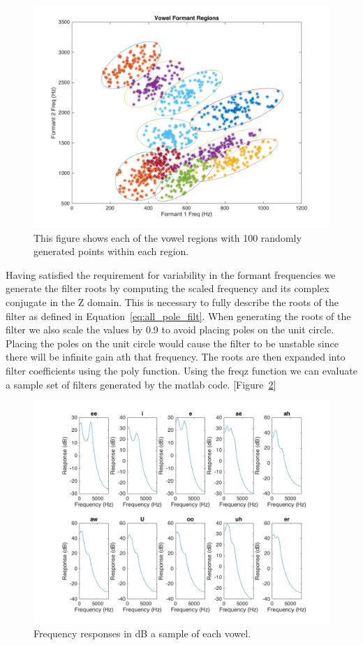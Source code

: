 \documentclass{article}
\begin{document}
\begin{figure}[h]
  \centering
    \includegraphics[width=.4\textheight]{vowel_formant_regions.png}
  \caption{This figure shows each of the vowel regions with 100 randomly generated points within each region.}
  \label{fig:vowel_formant_regions}
\end{figure}
Having satisfied the requirement for variability in the formant frequencies we generate the filter roots by computing the scaled frequency and its complex conjugate in the Z domain. This is necessary to fully describe the roots of the filter as defined in Equation~\eqref{eq:all_pole_filt}. When generating the roots of the filter we also scale the values by 0.9 to avoid placing poles on the unit circle. Placing the poles on the unit circle would cause the filter to be unstable since there will be infinite gain ath that frequency. The roots are then expanded into filter coefficients using the poly function.
Using the freqz function we can evaluate a sample set of filters generated by the matlab code. [Figure~\ref{fig:vowel_filter_response}]

\begin{figure}[h]
  \centering
    \includegraphics[width=.4\textheight]{vowel_filter_response.png}
  \caption{Frequency responses in dB a sample of each vowel.}
  \label{fig:vowel_filter_response}
\end{figure}
\end{document}
